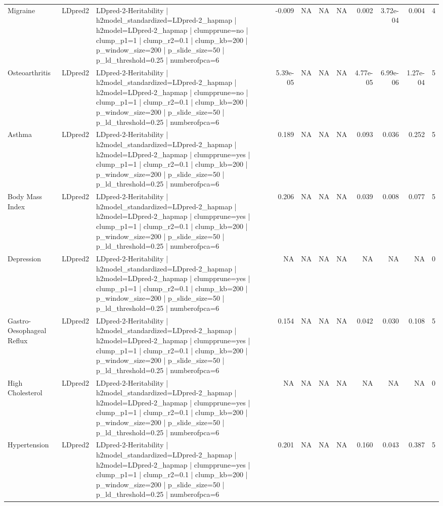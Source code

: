 \begin{landscape}
\begin{longtable}{p{2.4cm}p{1.8cm}p{6.0cm}rrrrrrrr}
Migraine & LDpred2 & LDpred-2-Heritability | h2model\_standardized=LDpred-2\_hapmap | h2model=LDpred-2\_hapmap | clumpprune=no | clump\_p1=1 | clump\_r2=0.1 | clump\_kb=200 | p\_window\_size=200 | p\_slide\_size=50 | p\_ld\_threshold=0.25 | numberofpca=6 & -0.009 & NA & NA & NA & 0.002 & 3.72e-04 & 0.004 & 4 \\
Osteoarthritis & LDpred2 & LDpred-2-Heritability | h2model\_standardized=LDpred-2\_hapmap | h2model=LDpred-2\_hapmap | clumpprune=no | clump\_p1=1 | clump\_r2=0.1 | clump\_kb=200 | p\_window\_size=200 | p\_slide\_size=50 | p\_ld\_threshold=0.25 | numberofpca=6 & 5.39e-05 & NA & NA & NA & 4.77e-05 & 6.99e-06 & 1.27e-04 & 5 \\
Asthma & LDpred2 & LDpred-2-Heritability | h2model\_standardized=LDpred-2\_hapmap | h2model=LDpred-2\_hapmap | clumpprune=yes | clump\_p1=1 | clump\_r2=0.1 | clump\_kb=200 | p\_window\_size=200 | p\_slide\_size=50 | p\_ld\_threshold=0.25 | numberofpca=6 & 0.189 & NA & NA & NA & 0.093 & 0.036 & 0.252 & 5 \\
Body Mass Index & LDpred2 & LDpred-2-Heritability | h2model\_standardized=LDpred-2\_hapmap | h2model=LDpred-2\_hapmap | clumpprune=yes | clump\_p1=1 | clump\_r2=0.1 | clump\_kb=200 | p\_window\_size=200 | p\_slide\_size=50 | p\_ld\_threshold=0.25 | numberofpca=6 & 0.206 & NA & NA & NA & 0.039 & 0.008 & 0.077 & 5 \\
Depression & LDpred2 & LDpred-2-Heritability | h2model\_standardized=LDpred-2\_hapmap | h2model=LDpred-2\_hapmap | clumpprune=yes | clump\_p1=1 | clump\_r2=0.1 | clump\_kb=200 | p\_window\_size=200 | p\_slide\_size=50 | p\_ld\_threshold=0.25 | numberofpca=6 & NA & NA & NA & NA & NA & NA & NA & 0 \\
Gastro-Oesophageal Reflux & LDpred2 & LDpred-2-Heritability | h2model\_standardized=LDpred-2\_hapmap | h2model=LDpred-2\_hapmap | clumpprune=yes | clump\_p1=1 | clump\_r2=0.1 | clump\_kb=200 | p\_window\_size=200 | p\_slide\_size=50 | p\_ld\_threshold=0.25 | numberofpca=6 & 0.154 & NA & NA & NA & 0.042 & 0.030 & 0.108 & 5 \\
High Cholesterol & LDpred2 & LDpred-2-Heritability | h2model\_standardized=LDpred-2\_hapmap | h2model=LDpred-2\_hapmap | clumpprune=yes | clump\_p1=1 | clump\_r2=0.1 | clump\_kb=200 | p\_window\_size=200 | p\_slide\_size=50 | p\_ld\_threshold=0.25 | numberofpca=6 & NA & NA & NA & NA & NA & NA & NA & 0 \\
Hypertension & LDpred2 & LDpred-2-Heritability | h2model\_standardized=LDpred-2\_hapmap | h2model=LDpred-2\_hapmap | clumpprune=yes | clump\_p1=1 | clump\_r2=0.1 | clump\_kb=200 | p\_window\_size=200 | p\_slide\_size=50 | p\_ld\_threshold=0.25 | numberofpca=6 & 0.201 & NA & NA & NA & 0.160 & 0.043 & 0.387 & 5 \\

\end{longtable}
\end{landscape}
